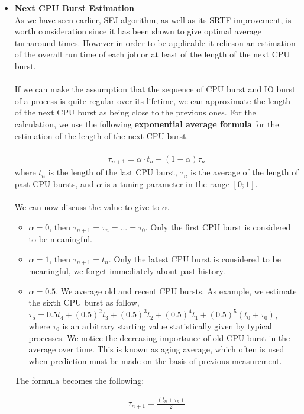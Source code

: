 \documentclass[11pt,a4paper]{scrreprt}
\begin{document}
\begin{itemize}
\item \textbf{Next CPU Burst Estimation} \\
As we have seen earlier, SFJ algorithm, as well as its SRTF improvement, is worth consideration since it has been shown to give optimal average turnaround times. However in order to be applicable it relieson an estimation of the overall run time of each job or at least of the length of the next CPU burst. \\\\
If we can make the assumption that the sequence of CPU burst and IO burst of a process is quite regular over its lifetime, we can approximate the length of the next CPU burst as being close to the previous ones. For the calculation, we use the following \textbf{exponential average formula} for the estimation of the length of the next CPU burst. \\\\
\begin{align}
\tau_{n+1} = \alpha \cdot t_n + (1 - \alpha ) \tau_n
\end{align}
where $t_n$ is the length of the last CPU burst, $\tau_n$ is the average of the length of past CPU bursts, and $\alpha$ is a tuning parameter in the range $[0; 1]$.\\\\
We can now discuss the value to give to $\alpha$.
\begin{itemize}
\item $\alpha = 0$, then $\tau_{n+1} = \tau_n = ... = \tau_0$. Only the first CPU burst is considered to be meaningful.
\item $\alpha = 1$, then $\tau_{n+1} = t_n$. Only the latest CPU burst is considered to be meaningful, we forget immediately about past history.
\item $\alpha = 0.5$. We average old and recent CPU bursts. As example, we estimate the sixth CPU burst as follow, $\tau_5 = 0.5 t_4 + (0.5)^2 t_3 + (0.5)^3 t_2 + (0.5)^4 t_1 + (0.5)^5 (t_0 + \tau_0)$, where $\tau_0$ is an arbitrary starting value statistically given by typical processes. We notice the decreasing importance of old CPU burst in the average over time. This is known as aging average, which often is used when prediction must be made on the basis of previous measurement.
\end{itemize}

The formula becomes the following:

\begin{align}
\tau_{n+1} = \frac{(t_n + \tau_n)}{2}
\end{align}


\end{itemize}
\end{document}

